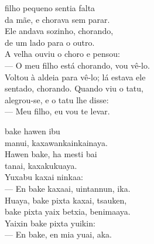 

 filho pequeno sentia falta\\
da mãe, e chorava sem parar.\\
Ele andava sozinho, chorando,\\
de um lado para o outro.\\
A velha ouviu o choro e pensou:\\
--- O meu filho está chorando, vou vê-lo.\\
Voltou à aldeia para vê-lo; lá estava ele\\
sentado, chorando. Quando viu o tatu,\\
alegrou-se, e o tatu lhe disse:\\
--- Meu filho, eu vou te levar.

\vspace{2em}

 bake hawen ibu\\
manui, kaxawankainkainaya.\\
Hawen bake, ha mesti bai\\
tanai, kaxakukuaya.\\
Yuxabu kaxai ninkaa:\\
--- En bake kaxaai, uintannun, ika.\\
Huaya, bake pixta kaxai, tsauken,\\
bake pixta yaix betxia, benimaaya.\\
Yaixin bake pixta yuikin:\\
--- En bake, en mia yuai, aka.

